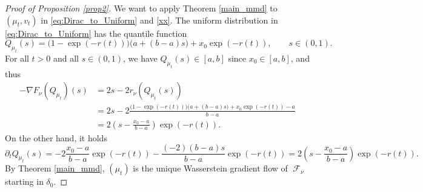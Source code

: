 \documentclass{article}
\DeclareMathOperator{\F}{\mathcal F}
\theoremstyle{plain}
\theoremstyle{definition}
\theoremstyle{remark}
\begin{document}
\begin{proof}[Proof of Proposition \ref{prop2}]
We want to apply Theorem \ref{main_mmd} to $(\mu_t,v_t)$ in \eqref{eq:Dirac_to_Uniform} and \eqref{xx}.
The uniform distribution in \eqref{eq:Dirac_to_Uniform}
has the quantile function
\begin{equation*}
         Q_{\mu_t}(s)
        = \big( 1-\exp\left(-r(t)\right)\big) 
        \big(a +(b - a) s \big) + x_0 \exp\left(-r(t)\right)
        ,
        \qquad s \in (0, 1).
    \end{equation*}
For all $t > 0$ and all $s \in (0, 1)$, we have $Q_{\mu_t}(s) \in [a, b]$ since $x_0 \in [a, b]$, and thus
    \begin{align*}
        - \nabla F_\nu(Q_{\mu_t})(s)
        &= 2 s - 2 r_{\nu}(Q_{\mu_t}(s))\\
        &= 2 s - 2 \frac{\big( 1-\exp\left(-r(t)\right)\big) 
        \big(a +(b - a) s \big) + x_0 \exp\left(-r(t)\right)- a}{b - a} \\
        & = 2 \left( s-  \frac{x_0 - a}{b - a}\right) \exp\left(-r(t)\right).
        \end{align*}
On the other hand, it holds 
 \begin{equation*}
        \partial_t Q_{\mu_t}(s)
        = -2 \frac{x_0 - a}{b - a} \exp\left(-r(t)\right) - \frac{(-2) (b - a) s}{b - a} \exp\left(-r(t)\right)
        = 2 \left( s - \frac{x_0 - a}{b - a}\right) \exp\left(-r(t)\right).
    \end{equation*}
By Theorem \ref{main_mmd}, $(\mu_t)$ is the unique Wasserstein gradient flow of $\F_\nu$ starting in $\delta_0$. 


\end{proof}
\end{document}

